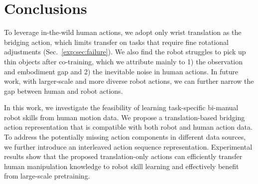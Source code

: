 \section{Conclusions}

% 
To leverage in-the-wild human actions, we adopt only wrist translation as the bridging action, which limits transfer on tasks that require fine rotational adjustments (Sec.~\ref{exp:sec:failure}). 
% 
We also find the robot struggles to pick up thin objects after co-training, which we attribute mainly to 1) the observation and embodiment gap and 2) the inevitable noise in human actions.
% 
In future work, with larger-scale and more diverse robot actions, we can further narrow the gap between human and robot actions.


% 
In this work, we investigate the feasibility of learning task-specific bi-manual robot skills from human motion data.
% 
We propose a translation-based bridging action representation that is compatible with both robot and human action data. 
% 
To address the potentially missing action components in different data sources, we further introduce an interleaved action sequence representation.
% 
Experimental results show that the proposed translation-only actions can efficiently transfer human manipulation knowledge to robot skill learning and effectively benefit from large-scale pretraining.